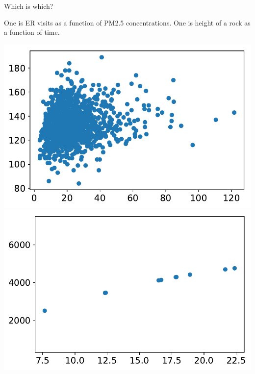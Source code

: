 \documentclass[aspectratio=169]{beamer}
\begin{document}
\begin{frame}{Which is which?}

One is ER visits as a function of PM2.5 concentrations.  One is height of a rock as a function of time.

\vspace{5mm}

\includegraphics[scale=0.475]{data/Huang_et_al/huang_pm25vcirc_notitle.pdf}\vspace{10mm}\hspace{8mm}\includegraphics[scale=0.475]{data/Huang_et_al/projectile_notitle.pdf}

\end{frame}
\end{document}
